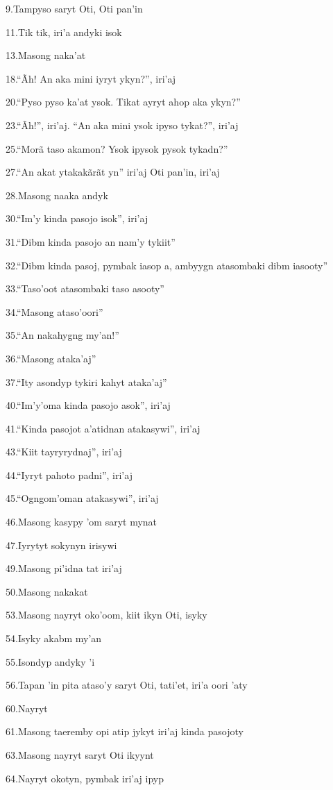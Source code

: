 9.Tampyso saryt Oti, Oti pan'in

11.Tik tik, iri'a andyki isok

13.Masong naka'at

18.``Ãh! An aka mini iyryt ykyn?'', iri'aj

20.``Pyso pyso ka'at ysok. Tikat ayryt ahop aka ykyn?''

23.``Ãh!'', iri'aj. ``An aka mini ysok ipyso tykat?'', iri'aj

25.``Morã taso akamon? Ysok ipysok pysok tykadn?''

27.``An akat ytakakãrãt yn'' iri'aj Oti pan'in, iri'aj

28.Masong naaka andyk

30.``Im'y kinda pasojo isok'', iri'aj

31.``Dibm kinda pasojo an nam'y tykiit''

32.``Dibm kinda pasoj, pymbak iasop a, ambyygn atasombaki dibm iasooty''

33.``Taso'oot atasombaki taso asooty''

34.``Masong ataso'oori''

35.``An nakahygng my'an!''

36.``Masong ataka'aj''

37.``Ity asondyp tykiri kahyt ataka'aj''

40.``Im'y'oma kinda pasojo asok'', iri'aj

41.``Kinda pasojot a'atidnan atakasywi'', iri'aj

43.``Kiit tayryrydnaj'', iri'aj

44.``Iyryt pahoto padni'', iri'aj

45.``Ogngom'oman atakasywi'', iri'aj

46.Masong kasypy 'om saryt mynat

47.Iyrytyt sokynyn irisywi

49.Masong pi'idna tat iri'aj

50.Masong nakakat

53.Masong nayryt oko'oom, kiit ikyn Oti, isyky

54.Isyky akabm my'an

55.Isondyp andyky 'i

56.Tapan 'in pita ataso'y saryt Oti, tati'et, iri'a oori 'aty

60.Nayryt

61.Masong taeremby opi atip jykyt iri'aj kinda pasojoty

63.Masong nayryt saryt Oti ikyynt

64.Nayryt okotyn, pymbak iri'aj ipyp

